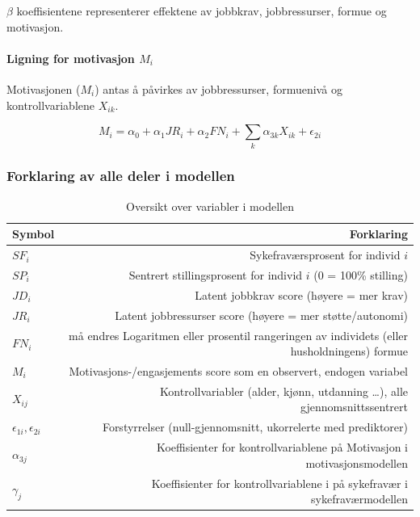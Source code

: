 \documentclass[
  12pt,
  a4paper,
  DIV=11,
  numbers=noendperiod]{scrartcl}
\let\oldparagraph\paragraph
\renewcommand{\paragraph}[1]{\oldparagraph{#1}\mbox{}}
\begin{document}
\(\beta\) koeffisientene representerer effektene av jobbkrav,
jobbressurser, formue og motivasjon.

\paragraph{\texorpdfstring{Ligning for motivasjon
\(M_i\)}{Ligning for motivasjon M\_i}}\label{ligning-for-motivasjon-m_i}

Motivasjonen (\(M_i\)) antas å påvirkes av jobbressurser, formuenivå og
kontrollvariablene \(X_{ik}\).

\[
M_i = \alpha_0 + \alpha_1 JR_i + \alpha_2 FN_i + \sum_k \alpha_{3k}X_{ik} + \epsilon_{2i} \label{eq:motivasjon}
\]

\subsubsection{Forklaring av alle deler i
modellen}\label{forklaring-av-alle-deler-i-modellen}

\begin{table}[H]
\centering
\begin{tabular}{lr}
\toprule
Symbol & Forklaring \\ 
\midrule
$SF_i$ & Sykefraværsprosent for individ $i$ \\
$SP_i$ & Sentrert stillingsprosent for individ $i$ (0 = 100\% stilling) \\
$JD_i$ & Latent jobbkrav score (høyere = mer krav) \\
$JR_i$ & Latent jobbressurser score (høyere = mer støtte/autonomi) \\
$FN_i$ & må endres Logaritmen eller prosentil rangeringen av individets (eller husholdningens) formue \\
$M_i$ & Motivasjons-/engasjements score som en observert, endogen variabel \\
$X_{ij}$ & Kontrollvariabler (alder, kjønn, utdanning …), alle gjennomsnittssentrert \\
$\epsilon_{1i}, \epsilon_{2i}$ & Forstyrrelser (null-gjennomsnitt, ukorrelerte med prediktorer) \\  
$\alpha_{3j} $ & Koeffisienter for kontrollvariablene på Motivasjon i motivasjonsmodellen \\
$\gamma_{j} $ & Koeffisienter for kontrollvariablene i på sykefravær i sykefraværmodellen \\
\hline
\end{tabular}
\caption{Oversikt over variabler i modellen}
\label{tab:variabler}
\end{table}
\end{document}
